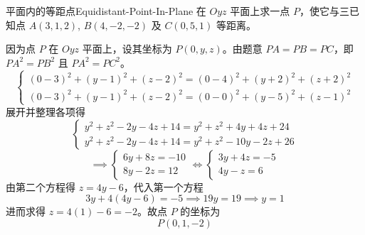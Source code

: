 \begin{problem}{平面内的等距点}{Equidistant-Point-In-Plane}
    在 $Oyz$ 平面上求一点 $P$，使它与三已知点 $A(3, 1, 2)$, $B(4, -2, -2)$ 及 $C(0, 5, 1)$ 等距离。
\end{problem}

\begin{solution}
    因为点 $P$ 在 $Oyz$ 平面上，设其坐标为 $P(0, y, z)$。由题意 $PA = PB = PC$，即 $PA^2 = PB^2$ 且 $PA^2 = PC^2$。
    \begin{equation}
        \begin{cases}
            (0 - 3)^2 + (y - 1)^2 + (z - 2)^2 = (0 - 4)^2 + (y + 2)^2 + (z + 2)^2 \\
            (0 - 3)^2 + (y - 1)^2 + (z - 2)^2 = (0 - 0)^2 + (y - 5)^2 + (z - 1)^2
        \end{cases}
    \end{equation}
    展开并整理各项得
    \begin{equation}
        \begin{cases}
            y^2 + z^2 - 2y - 4z + 14 = y^2 + z^2 + 4y + 4z + 24 \\
            y^2 + z^2 - 2y - 4z + 14 = y^2 + z^2 - 10y - 2z + 26
        \end{cases}
    \end{equation}
    \begin{equation}
        \implies
        \begin{cases}
            6y + 8z = -10 \\
            8y - 2z = 12
        \end{cases}
        \iff
        \begin{cases}
            3y + 4z = -5 \\
            4y - z = 6
        \end{cases}
    \end{equation}
    由第二个方程得 $z = 4y - 6$，代入第一个方程
    \begin{equation}
        3y + 4(4y - 6) = -5 \implies 19y = 19 \implies y = 1
    \end{equation}
    进而求得 $z = 4(1) - 6 = -2$。故点 $P$ 的坐标为
    \begin{equation}
        \boxed{P(0, 1, -2)}
    \end{equation}
\end{solution}

\endinput
